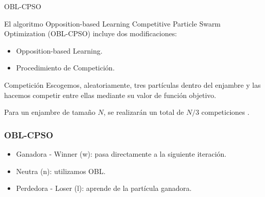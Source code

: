 \begin{frame}{OBL-CPSO}
\begin{block}{}
El algoritmo Opposition-based Learning Competitive Particle Swarm Optimization (OBL-CPSO) \cite{oblcpso} incluye dos modificaciones:
\begin{itemize}
	\item Opposition-based Learning.
	\item Procedimiento de Competición.
\end{itemize}
\end{block}

\begin{block}{Competición}
Escogemos, aleatoriamente, tres partículas dentro del enjambre y las hacemos competir entre ellas mediante su valor de función objetivo. 
\end{block}
\begin{block}{}
Para un enjambre de tamaño $N$, se realizarán un total de $N/3$ competiciones \cite{oblcpso}.
\end{block}
\end{frame}

\begin{frame}
\frametitle{OBL-CPSO}
\begin{block}{}
\begin{itemize}
	\item Ganadora - Winner (w): pasa directamente a la siguiente iteración.
	\item Neutra (n): utilizamos OBL.
	\item Perdedora - Loser (l): aprende de la partícula ganadora.
\end{itemize}
\end{block}
\end{frame}

